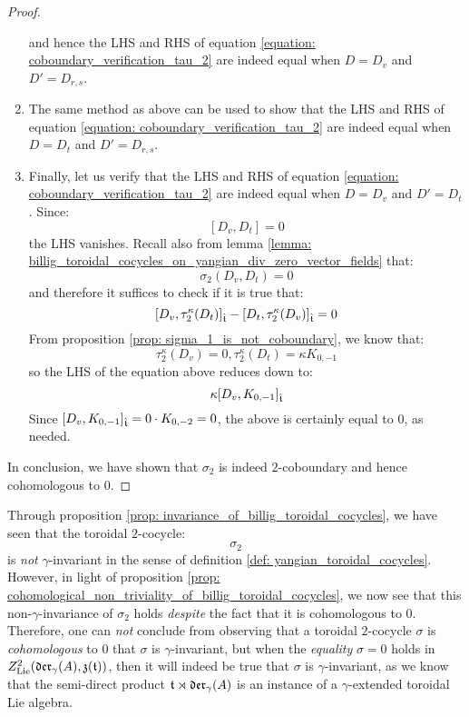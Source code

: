 \begin{proof}
\begin{enumerate}
$$                        $$
                    and hence the LHS and RHS of equation \eqref{equation: coboundary_verification_tau_2} are indeed equal when $D = D_v$ and $D' = D_{r, s}$.
                    \item The same method as above can be used to show that the LHS and RHS of equation \eqref{equation: coboundary_verification_tau_2} are indeed equal when $D = D_t$ and $D' = D_{r, s}$.
                    \item Finally, let us verify that the LHS and RHS of equation \eqref{equation: coboundary_verification_tau_2} are indeed equal when $D = D_v$ and $D' = D_t$. Since:
                        $$[D_v, D_t] = 0$$
                    the LHS vanishes. Recall also from lemma \ref{lemma: billig_toroidal_cocycles_on_yangian_div_zero_vector_fields} that:
                        $$\sigma_2(D_v, D_t) = 0$$
                    and therefore it suffices to check if it is true that:
                        $$[D_v, \tau_2^{\kappa}(D_t)]_{\hat{\mathfrak{t}}} - [D_t, \tau_2^{\kappa}(D_v)]_{\hat{\mathfrak{t}}} = 0$$
                    From proposition \ref{prop: sigma_1_is_not_coboundary}, we know that:
                        $$\tau_2^{\kappa}(D_v) = 0, \tau_2^{\kappa}(D_t) = \kappa K_{0, -1}$$
                    so the LHS of the equation above reduces down to:
                        $$\kappa [D_v, K_{0, -1}]_{\hat{\mathfrak{t}}}$$
                    Since $[D_v, K_{0, -1}]_{\hat{\mathfrak{t}}} = 0 \cdot K_{0, -2} = 0$, the above is certainly equal to $0$, as needed.
                \end{enumerate}
                In conclusion, we have shown that $\sigma_2$ is indeed $2$-coboundary and hence cohomologous to $0$.
            \end{proof}
        \begin{remark}
            Through proposition \ref{prop: invariance_of_billig_toroidal_cocycles}, we have seen that the toroidal $2$-cocycle:
                $$\sigma_2$$
            is \textit{not} $\gamma$-invariant in the sense of definition \ref{def: yangian_toroidal_cocycles}. However, in light of proposition \ref{prop: cohomological_non_triviality_of_billig_toroidal_cocycles}, we now see that this non-$\gamma$-invariance of $\sigma_2$ holds \textit{despite} the fact that it is cohomologous to $0$. Therefore, one can \textit{not} conclude from observing that a toroidal $2$-cocycle $\sigma$ is \textit{cohomologous} to $0$ that $\sigma$ is $\gamma$-invariant, but when the \textit{equality} $\sigma = 0$ holds in $Z^2_{\mathrm{Lie}}(\mathfrak{der}_{\gamma}(A), \mathfrak{z}(\mathfrak{t}))$, then it will indeed be true that $\sigma$ is $\gamma$-invariant, as we know that the semi-direct product $\mathfrak{t} \rtimes \mathfrak{der}_{\gamma}(A)$ is an instance of a $\gamma$-extended toroidal Lie algebra.
        \end{remark}